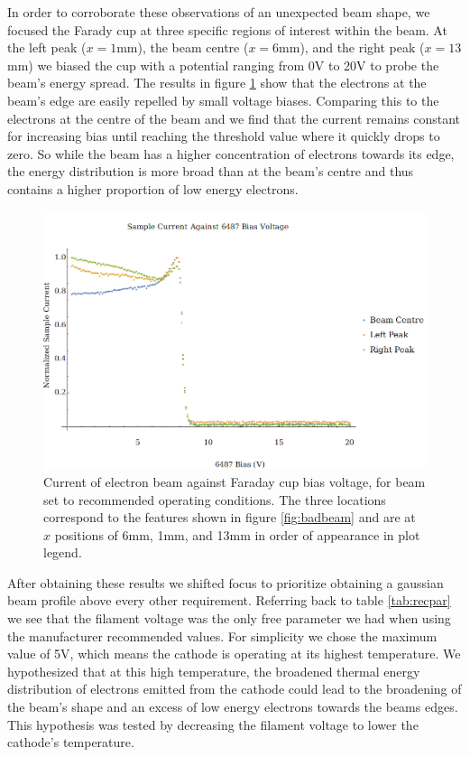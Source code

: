 In order to corroborate these observations of an unexpected beam shape, we focused the Farady cup at three specific regions of interest within the beam.
At the left peak ($x=1$mm), the beam centre ($x=6$mm), and the right peak ($x=13$mm) we biased the cup with a potential ranging from 0V to 20V to probe the 
beam's energy spread. The results in figure \ref{fig:enres} show that the electrons at the beam's edge are easily repelled by small voltage 
biases. Comparing this to the electrons at the centre of the beam and we find that the current remains constant for increasing bias until reaching the 
threshold value where it quickly drops to zero. So while the beam has a higher concentration of electrons towards its edge, the energy distribution 
is more broad than at the beam's centre and thus contains a higher proportion of low energy electrons. 

\begin{figure}[h!]
    \centering
    \includegraphics[width=0.85\linewidth]{../Test Scans/GunResPlots/ContactPotentialLocationsInBeam.png}
	\caption{Current of electron beam against Faraday cup bias voltage, for beam set to recommended operating conditions. The three locations correspond to 
	the features shown in figure \ref{fig:badbeam} and are at $x$ positions of 6mm, 1mm, and 13mm in order of appearance in plot legend.}
    \label{fig:enres}
\end{figure}

After obtaining these results we shifted focus to prioritize obtaining a gaussian beam profile above every other requirement. Referring back to 
table \ref{tab:recpar} we see that the filament voltage was the only free parameter we had when using the manufacturer recommended values. For simplicity
we chose the maximum value of 5V, which means the cathode is operating at its highest temperature. We hypothesized that at this high temperature, 
the broadened thermal energy distribution of electrons emitted from the cathode could lead to the broadening of the beam's shape and an excess of 
low energy electrons towards the beams edges. This hypothesis was tested by decreasing the filament voltage to lower the cathode's temperature.


